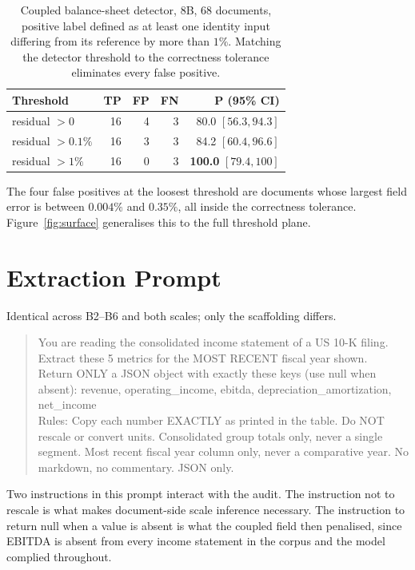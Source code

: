 \documentclass[11pt]{article}
\newcommand{\best}[1]{\textbf{#1}}
\begin{document}
\begin{table}[h]
\centering\small
\begin{tabular}{@{}lrrrr@{}}
\toprule
\textbf{Threshold} & \textbf{TP} & \textbf{FP} & \textbf{FN} & \textbf{P (95\% CI)} \\
\midrule
residual $>0$      & 16 & 4 & 3 & 80.0 $[56.3, 94.3]$ \\
residual $>0.1\%$  & 16 & 3 & 3 & 84.2 $[60.4, 96.6]$ \\
residual $>1\%$    & 16 & 0 & 3 & \best{100.0} $[79.4, 100]$ \\
\bottomrule
\end{tabular}
\caption{Coupled balance-sheet detector, 8B, $68$ documents, positive label defined as
at least one identity input differing from its reference by more than $1\%$. Matching
the detector threshold to the correctness tolerance eliminates every false positive.}
\label{tab:detconf}
\end{table}

The four false positives at the loosest threshold are documents whose largest field
error is between $0.004\%$ and $0.35\%$, all inside the correctness tolerance.
Figure~\ref{fig:surface} generalises this to the full threshold plane.


\section{Extraction Prompt}
\label{app:prompts}

Identical across B2--B6 and both scales; only the scaffolding differs.

\begin{quote}\footnotesize\ttfamily\raggedright
You are reading the consolidated income statement of a US 10-K filing. Extract these 5
metrics for the MOST RECENT fiscal year shown.\\[2pt]
Return ONLY a JSON object with exactly these keys (use null when absent):
revenue, operating\_income, ebitda, depreciation\_\-amortization, net\_income\\[2pt]
Rules: Copy each number EXACTLY as printed in the table. Do NOT rescale or convert
units. Consolidated group totals only, never a single segment. Most recent fiscal year
column only, never a comparative year. No markdown, no commentary. JSON only.
\end{quote}

Two instructions in this prompt interact with the audit. The instruction not to rescale
is what makes document-side scale inference necessary. The instruction to return null
when a value is absent is what the coupled field then penalised, since EBITDA is absent
from every income statement in the corpus and the model complied throughout.
\end{document}
